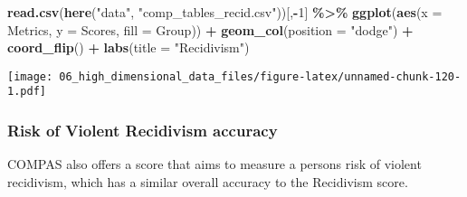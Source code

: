 \documentclass[
]{book}
\newenvironment{Shaded}{\begin{snugshade}}{\end{snugshade}}
\newcommand{\DataTypeTok}[1]{\textcolor[rgb]{0.13,0.29,0.53}{#1}}
\newcommand{\DecValTok}[1]{\textcolor[rgb]{0.00,0.00,0.81}{#1}}
\newcommand{\KeywordTok}[1]{\textcolor[rgb]{0.13,0.29,0.53}{\textbf{#1}}}
\newcommand{\NormalTok}[1]{#1}
\newcommand{\OperatorTok}[1]{\textcolor[rgb]{0.81,0.36,0.00}{\textbf{#1}}}
\newcommand{\StringTok}[1]{\textcolor[rgb]{0.31,0.60,0.02}{#1}}
\begin{document}
\begin{Shaded}
\begin{Highlighting}[]
\KeywordTok{read.csv}\NormalTok{(}\KeywordTok{here}\NormalTok{(}\StringTok{"data"}\NormalTok{, }\StringTok{"comp\_tables\_recid.csv"}\NormalTok{))[,}\OperatorTok{{-}}\DecValTok{1}\NormalTok{] }\OperatorTok{\%\textgreater{}\%}
\StringTok{  }\KeywordTok{ggplot}\NormalTok{(}\KeywordTok{aes}\NormalTok{(}\DataTypeTok{x =}\NormalTok{ Metrics, }\DataTypeTok{y =}\NormalTok{ Scores, }\DataTypeTok{fill =}\NormalTok{ Group)) }\OperatorTok{+}
\StringTok{  }\KeywordTok{geom\_col}\NormalTok{(}\DataTypeTok{position =} \StringTok{"dodge"}\NormalTok{) }\OperatorTok{+}
\StringTok{  }\KeywordTok{coord\_flip}\NormalTok{() }\OperatorTok{+}
\StringTok{  }\KeywordTok{labs}\NormalTok{(}\DataTypeTok{title =} \StringTok{"Recidivism"}\NormalTok{)}
\end{Highlighting}
\end{Shaded}

\texttt{[image: 06\_high\_dimensional\_data\_files/figure-latex/unnamed-chunk-120-1.pdf]}

\hypertarget{risk-of-violent-recidivism-accuracy}{%
\subsubsection{Risk of Violent Recidivism accuracy}\label{risk-of-violent-recidivism-accuracy}}

COMPAS also offers a score that aims to measure a persons risk of violent recidivism, which has a similar overall accuracy to the Recidivism score.
\end{document}
